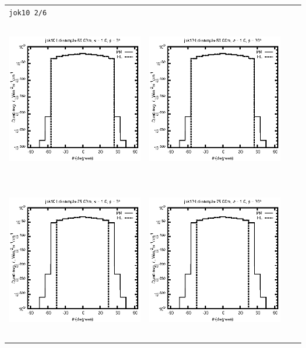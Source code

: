 \begin{tabular}{c c c c}
\multicolumn{4}{l}{\texttt{jok10 2/6}} \\
\includegraphics[height=7cm]{../eps/jok10_Ld_sample_50.00m_fwd.eps} &
\includegraphics[height=7cm]{../eps/jok10_Ld_sample_50.00m_cross.eps} \\
\includegraphics[height=7cm]{../eps/jok10_Ld_sample_75.00m_fwd.eps} &
\includegraphics[height=7cm]{../eps/jok10_Ld_sample_75.00m_cross.eps} \\

\end{tabular}
